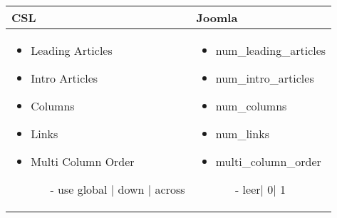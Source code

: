 \begin{minipage}{0.6\textwidth}
\begin{tabular}{|p{}|p{}|}
\hline
\textbf{CSL} & \textbf{Joomla} \\ 
\hline
\begin{itemize}
	\item Leading Articles 
	\item Intro Articles
	\item Columns
	\item  Links
	\item Multi Column Order
	\begin{enumerate}
	  	\item[-] use global | down | across
	\end{enumerate} 
\end{itemize}
 & 
\begin{itemize}
	\item num\_leading\_articles 
	\item num\_intro\_articles 
	\item num\_columns 
	\item num\_links 
	\item multi\_column\_order
	\begin{enumerate}
		\item[-] leer| 0| 1
	\end{enumerate} 
\end{itemize}
\\
\hline
\end{tabular}
\end{minipage}

